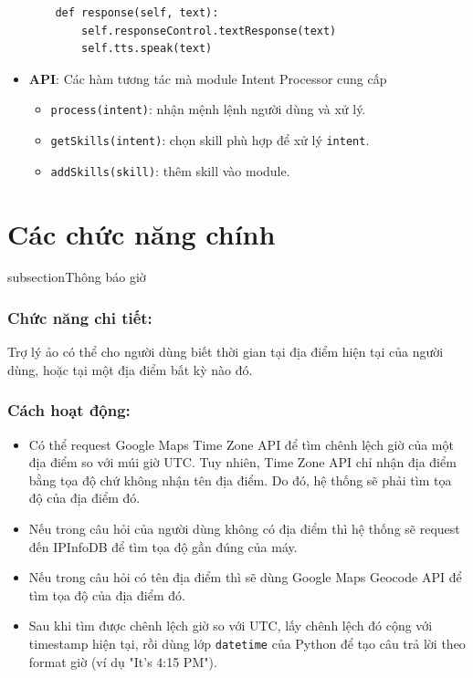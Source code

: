 \begin{itemize}
\begin{lstlisting}
    def response(self, text):
        self.responseControl.textResponse(text)
        self.tts.speak(text)
\end{lstlisting}
\item \textbf{API}: Các hàm tương tác mà module Intent Processor cung cấp
\begin{itemize}
\item \lstinline{process(intent)}: nhận mệnh lệnh người dùng và xử lý.
\item \lstinline{getSkills(intent)}: chọn skill phù hợp để xử lý \lstinline{intent}.
\item \lstinline{addSkills(skill)}: thêm skill vào module.
\end{itemize}
\end{itemize}

\section{Các chức năng chính}
subsection{Thông báo giờ}

\subsubsection{Chức năng chi tiết:}

Trợ lý ảo có thể cho người dùng biết thời gian tại địa điểm hiện tại của người dùng, hoặc tại một địa điểm bất kỳ nào đó.

\subsubsection{Cách hoạt động:}

\begin{itemize}
    \item Có thể request Google Maps Time Zone API để tìm chênh lệch giờ của một địa điểm so với múi giờ UTC. Tuy nhiên, Time Zone API chỉ nhận địa điểm bằng tọa độ chứ không nhận tên địa điểm. Do đó, hệ thống sẽ phải tìm tọa độ của địa điểm đó.
    \item Nếu trong câu hỏi của người dùng không có địa điểm thì hệ thống sẽ request đến IPInfoDB để tìm tọa độ gần đúng của máy.
    \item Nếu trong câu hỏi có tên địa điểm thì sẽ dùng Google Maps Geocode API để tìm tọa độ của địa điểm đó.
    \item Sau khi tìm được chênh lệch giờ so với UTC, lấy chênh lệch đó cộng với timestamp hiện tại, rồi dùng lớp \lstinline{datetime} của Python để tạo câu trả lời theo format giờ (ví dụ "It's 4:15 PM").
\end{itemize}

